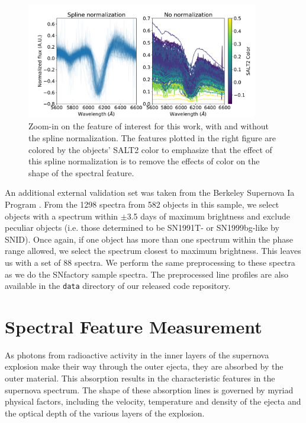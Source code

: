 \begin{figure}[htbp]
    \centering
    \includegraphics[width=0.9\textwidth]{figures/si_feat_pca/compare_spline_norm.pdf}
    \caption{Zoom-in on the feature of interest for this work, with and without the spline normalization. The features plotted in the right figure are colored by the objects' SALT2 color to emphasize that the effect of this spline normalization is to remove the effects of color on the shape of the spectral feature.}
    \label{compare_spline_norm}
\end{figure}

An additional external validation set was taken from the Berkeley Supernova Ia Program \citep[BSNIP,][]{silverman_berkeley_2012}. From the 1298 spectra from 582 objects in this sample, we select objects with a spectrum within $\pm$3.5 days of maximum brightness and exclude peculiar objects (i.e. those determined to be SN1991T- or SN1999bg-like by SNID). Once again, if one object has more than one spectrum within the phase range allowed, we select the spectrum closest to maximum brightness. This leaves us with a set of 88 spectra. We perform the same preprocessing to these spectra as we do the SNfactory sample spectra. The preprocessed line profiles are also available in the \verb|data| directory of our released code repository.

\section{Spectral Feature Measurement}
\label{spectral_features}
As photons from radioactive activity in the inner layers of the supernova explosion make their way through the outer ejecta, they are absorbed by the outer material. This absorption results in the characteristic features in the supernova spectrum. The shape of these absorption lines is governed by myriad physical factors, including the velocity, temperature and density of the ejecta and the optical depth of the various layers of the explosion.

